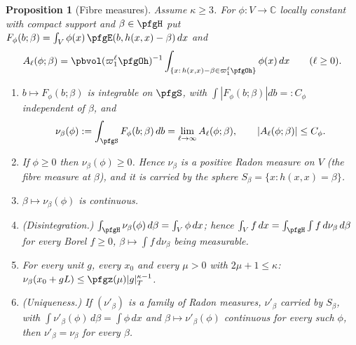\documentclass[10pt]{amsart}
\newtheorem{proposition}[theorem]{Proposition}
\theoremstyle{definition}
\theoremstyle{remark}
\newcommand{\C}{\mathbb C}
\begin{document}
\begin{proposition}[Fibre measures]\label{pfg:fibres}
Assume $\kappa\ge3$. For $\phi\colon V\to\C$ locally constant with compact support and $\beta\in\pfgH$ put
$F_\phi(b;\beta)=\int_V\phi(x)\,\pfgE(b,h(x,x)-\beta)\,dx$ and
\[
A_\ell(\phi;\beta)=\pbvol(\varpi_1^\ell\pfgOh)^{-1}\int_{\{x:\,h(x,x)-\beta\in\varpi_1^\ell\pfgOh\}}\phi(x)\,dx\qquad(\ell\ge0).
\]
\begin{enumerate}
\item[(a)] $b\mapsto F_\phi(b;\beta)$ is integrable on $\pfgS$, with $\int|F_\phi(b;\beta)|db=:C_\phi$ independent of
$\beta$, and
\[
\nu_\beta(\phi):=\int_{\pfgS}F_\phi(b;\beta)\,db=\lim_{\ell\to\infty}A_\ell(\phi;\beta),\qquad|A_\ell(\phi;\beta)|\le C_\phi .
\]
\item[(b)] If $\phi\ge0$ then $\nu_\beta(\phi)\ge0$. Hence $\nu_\beta$ is a positive Radon measure on $V$ (the
\emph{fibre measure} at $\beta$), and it is carried by the sphere $S_\beta=\{x:h(x,x)=\beta\}$.
\item[(c)] $\beta\mapsto\nu_\beta(\phi)$ is continuous.
\item[(d)] (\emph{Disintegration.}) $\int_{\pfgH}\nu_\beta(\phi)\,d\beta=\int_V\phi\,dx$; hence $\int_Vf\,dx=\int_{\pfgH}
\int f\,d\nu_\beta\,d\beta$ for every Borel $f\ge0$, $\beta\mapsto\int f\,d\nu_\beta$ being measurable.
\item[(e)] For every unit $g$, every $x_0$ and every $\mu>0$ with $2\mu+1\le\kappa$:
$\nu_\beta(x_0+gL)\le\pfgz(\mu)|g|_T^{\kappa-1}$.
\item[(f)] (\emph{Uniqueness.}) If $(\nu'_\beta)$ is a family of Radon measures, $\nu'_\beta$ carried by $S_\beta$, with
$\int\nu'_\beta(\phi)\,d\beta=\int\phi\,dx$ and $\beta\mapsto\nu'_\beta(\phi)$ continuous for every such $\phi$, then
$\nu'_\beta=\nu_\beta$ for every $\beta$.
\end{enumerate}
\end{proposition}
\end{document}
